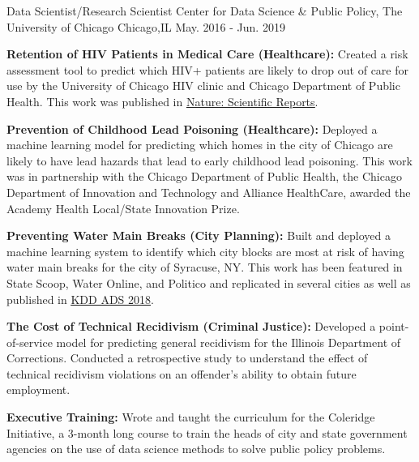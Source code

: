 \begin{cventries}
\cventry
    {Data Scientist/Research Scientist} %
    {Center for Data Science \& Public Policy, The University of Chicago} %
    {Chicago,IL} %
    {May. 2016 - Jun. 2019} %
    {\begin{cvitems}
        \setlength\itemsep{.15em}
        \item { \textbf{Retention of HIV Patients in Medical Care (Healthcare): }Created a risk assessment tool to predict which HIV+ patients are likely to drop out of care for use by the University of Chicago HIV clinic and Chicago Department of Public Health. This work was published in \href{https://www.nature.com/articles/s41598-020-62729-x}{\underline{Nature: Scientific Reports}}.}
        \item { \textbf{Prevention of Childhood Lead Poisoning (Healthcare): }Deployed a machine learning model for predicting which homes in the city of Chicago are likely to have lead hazards that lead to early childhood lead poisoning. This work was in  partnership with the Chicago Department of Public Health, the Chicago Department of Innovation and Technology and Alliance HealthCare, awarded the Academy Health Local/State Innovation Prize.}
         \item { \textbf{Preventing Water Main Breaks (City Planning): }Built and deployed a machine learning system to identify which city blocks are most at risk of having water main breaks for the city of Syracuse, NY. This work has been featured in State Scoop, Water Online, and Politico and replicated in several cities as well as published in \href{https://dl.acm.org/doi/abs/10.1145/3219819.3219835}{\underline{KDD ADS 2018}}.}
         \item { \textbf{The Cost of Technical Recidivism (Criminal Justice): }Developed a point-of-service model for predicting general recidivism for the Illinois Department of Corrections. Conducted a retrospective study to understand the effect of technical recidivism violations on an offender's ability to obtain future employment.}
         \item{ \textbf{Executive Training: }Wrote and taught the curriculum for the Coleridge Initiative, a 3-month long course to train the heads of city and state government agencies on the use of data science methods to solve public policy problems.}
     \end{cvitems}}




\end{cventries}
